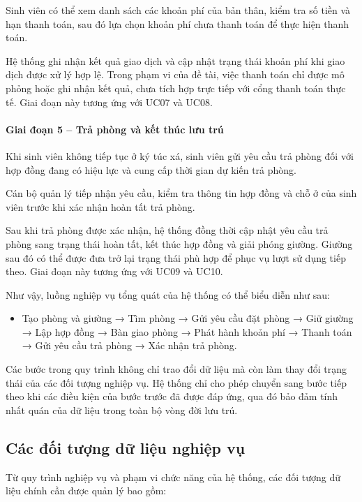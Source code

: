 Sinh viên có thể xem danh sách các khoản phí của bản thân, kiểm tra số tiền và hạn thanh toán, sau đó lựa chọn khoản phí chưa thanh toán để thực hiện thanh toán.

Hệ thống ghi nhận kết quả giao dịch và cập nhật trạng thái khoản phí khi giao dịch được xử lý hợp lệ. Trong phạm vi của đề tài, việc thanh toán chỉ được mô phỏng hoặc ghi nhận kết quả, chưa tích hợp trực tiếp với cổng thanh toán thực tế. Giai đoạn này tương ứng với UC07 và UC08.

\paragraph{Giai đoạn 5 – Trả phòng và kết thúc lưu trú}

Khi sinh viên không tiếp tục ở ký túc xá, sinh viên gửi yêu cầu trả phòng đối với hợp đồng đang có hiệu lực và cung cấp thời gian dự kiến trả phòng.

Cán bộ quản lý tiếp nhận yêu cầu, kiểm tra thông tin hợp đồng và chỗ ở của sinh viên trước khi xác nhận hoàn tất trả phòng.

Sau khi trả phòng được xác nhận, hệ thống đồng thời cập nhật yêu cầu trả phòng sang trạng thái hoàn tất, kết thúc hợp đồng và giải phóng giường. Giường sau đó có thể được đưa trở lại trạng thái phù hợp để phục vụ lượt sử dụng tiếp theo. Giai đoạn này tương ứng với UC09 và UC10.

Như vậy, luồng nghiệp vụ tổng quát của hệ thống có thể biểu diễn như sau:

\begin{itemize}[leftmargin=1.4em]
\item Tạo phòng và giường → Tìm phòng → Gửi yêu cầu đặt phòng → Giữ giường → Lập hợp đồng → Bàn giao phòng → Phát hành khoản phí → Thanh toán → Gửi yêu cầu trả phòng → Xác nhận trả phòng.
\end{itemize}

Các bước trong quy trình không chỉ trao đổi dữ liệu mà còn làm thay đổi trạng thái của các đối tượng nghiệp vụ. Hệ thống chỉ cho phép chuyển sang bước tiếp theo khi các điều kiện của bước trước đã được đáp ứng, qua đó bảo đảm tính nhất quán của dữ liệu trong toàn bộ vòng đời lưu trú.

\subsection{Các đối tượng dữ liệu nghiệp vụ}

Từ quy trình nghiệp vụ và phạm vi chức năng của hệ thống, các đối tượng dữ liệu chính cần được quản lý bao gồm:


